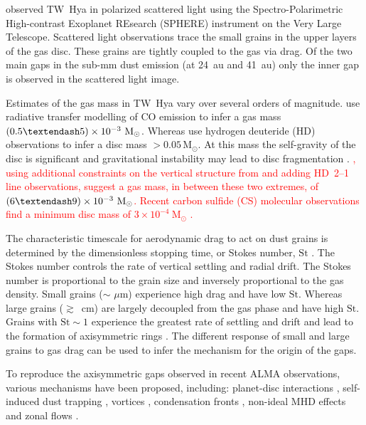 \documentclass[usenatbib,a4paper,times]{mnras}
\newcommand{\st}{\mathrm{St}}
\renewcommand{\sun}{\mathrm{M}_{\odot}}
\newcommand{\new}[1]{{\textcolor{red}{#1}}}
\begin{document}
\citet{van-boekel:2017} observed TW~Hya in polarized scattered light using the
Spectro-Polarimetric High-contrast Exoplanet REsearch (SPHERE) instrument on the
Very Large Telescope. Scattered light observations trace the small grains in the
upper layers of the gas disc. These grains are tightly coupled to the gas via
drag. Of the two main gaps in the sub-mm dust emission (at 24~au and 41~au) only
the inner gap is observed in the scattered light image.

Estimates of the gas mass in TW~Hya vary over several orders of magnitude.
\citet{thi:2010} use radiative transfer modelling of CO emission to infer a gas
mass $(0.5\textendash 5)\times10^{-3}~\sun{}$. Whereas \citet{bergin:2013} use
hydrogen deuteride (HD) observations to infer a disc mass $>0.05\,\sun{}$. At
this mass the self-gravity of the disc is significant and gravitational
instability may lead to disc fragmentation \citep{kratter:2016}.
\new{\citet{trapman:2017}, using additional constraints on the vertical
structure from \citet{kama:2016} and adding HD~2--1 line observations, suggest a
gas mass, in between these two extremes, of $(6\textendash
9)\times10^{-3}~\sun{}$. Recent carbon sulfide (CS) molecular observations find
a minimum disc mass of $3\times10^{-4}~\sun{}$ \citep{teague:2018a}.}

The characteristic timescale for aerodynamic drag to act on dust grains is
determined by the dimensionless stopping time, or Stokes number, $\st{}$
\citep{weidenschilling:1977, takeuchi:2002}. The Stokes number controls the rate
of vertical settling and radial drift. The Stokes number is proportional to the
grain size and inversely proportional to the gas density. Small grains ($\sim$
$\mu$m) experience high drag and have low $\st{}$. Whereas large grains
($\gtrsim$~cm) are largely decoupled from the gas phase and have high $\st{}$.
Grains with $\st{}\sim1$ experience the greatest rate of settling and drift and
lead to the formation of axisymmetric rings \citep{ayliffe:2012, dipierro:2015}.
The different response of small and large grains to gas drag can be used to
infer the mechanism for the origin of the gaps.

To reproduce the axisymmetric gaps observed in recent ALMA observations, various
mechanisms have been proposed, including: planet-disc interactions
\citep{dipierro:2015}, self-induced dust trapping \citep{gonzalez:2017},
vortices \citep{zhu:2014}, condensation fronts \citep{zhang:2015}, non-ideal MHD
effects \citep{bethune:2016} and zonal flows \citep{johansen:2009,flock:2015}.
\end{document}
